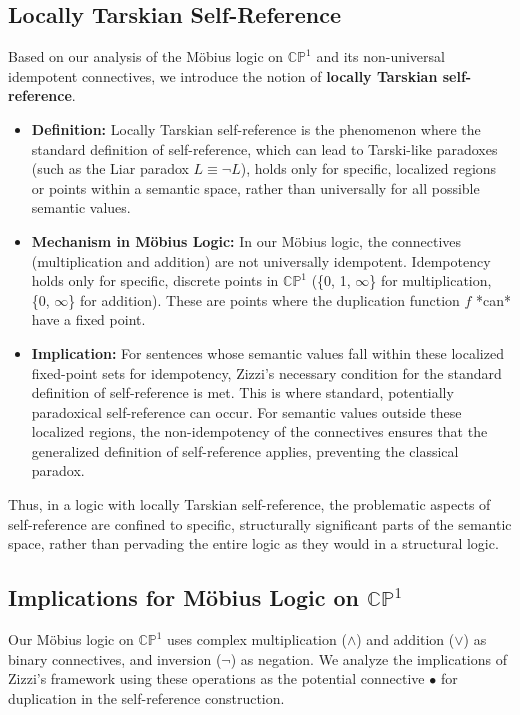 \documentclass{article}
\begin{document}
	\subsection{Locally Tarskian Self-Reference}
	
	Based on our analysis of the M\"{o}bius logic on \(\mathbb{CP}^1\) and its non-universal idempotent connectives, we introduce the notion of \textbf{locally Tarskian self-reference}.
	
	\begin{itemize}
		\item \textbf{Definition:} Locally Tarskian self-reference is the phenomenon where the standard definition of self-reference, which can lead to Tarski-like paradoxes (such as the Liar paradox \(L \equiv \neg L\)), holds only for specific, localized regions or points within a semantic space, rather than universally for all possible semantic values.
		\item \textbf{Mechanism in Möbius Logic:} In our M\"{o}bius logic, the connectives (multiplication and addition) are not universally idempotent. Idempotency holds only for specific, discrete points in \(\mathbb{CP}^1\) (\{0, 1, \(\infty\)\} for multiplication, \{0, \(\infty\)\} for addition). These are points where the duplication function \(f\) *can* have a fixed point.
		\item \textbf{Implication:} For sentences whose semantic values fall within these localized fixed-point sets for idempotency, Zizzi's necessary condition for the standard definition of self-reference is met. This is where standard, potentially paradoxical self-reference can occur. For semantic values outside these localized regions, the non-idempotency of the connectives ensures that the generalized definition of self-reference applies, preventing the classical paradox.
	\end{itemize}
	Thus, in a logic with locally Tarskian self-reference, the problematic aspects of self-reference are confined to specific, structurally significant parts of the semantic space, rather than pervading the entire logic as they would in a structural logic.
	
	\subsection{Implications for Möbius Logic on \(\mathbb{CP}^1\)}
	
	Our M\"{o}bius logic on \(\mathbb{CP}^1\) uses complex multiplication (\(\wedge\)) and addition (\(\vee\)) as binary connectives, and inversion (\(\neg\)) as negation. We analyze the implications of Zizzi's framework using these operations as the potential connective \(\bullet\) for duplication in the self-reference construction.
	
\end{document}
